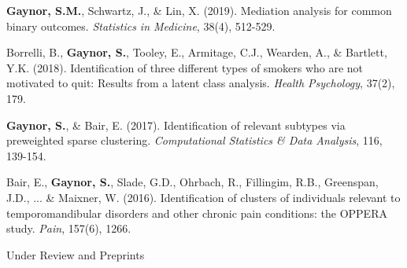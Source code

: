 \begin{cvpapers}
\cvpaper
    {\textbf{Gaynor, S.M.}, Schwartz, J., \& Lin, X. (2019). Mediation analysis for common binary outcomes. \textit{Statistics in Medicine}, 38(4), 512-529.} %
    {} %
    { } %
    {} %
    
    \cvpaper
    {Borrelli, B., \textbf{Gaynor, S.}, Tooley, E., Armitage, C.J., Wearden, A., \& Bartlett, Y.K. (2018). Identification of three different types of smokers who are not motivated to quit: Results from a latent class analysis. \textit{Health Psychology}, 37(2), 179.} %
    {} %
    { } %
    {} %
    
    
  \cvpaper
    {\textbf{Gaynor, S.}, \& Bair, E. (2017). Identification of relevant subtypes via preweighted sparse clustering. \textit{Computational Statistics \& Data Analysis}, 116, 139-154.} %
    {} %
    { } %
    {} %
    
 \cvpaper
    {Bair, E., \textbf{Gaynor, S.}, Slade, G.D., Ohrbach, R., Fillingim, R.B., Greenspan, J.D., ... \& Maixner, W. (2016). Identification of clusters of individuals relevant to temporomandibular disorders and other chronic pain conditions: the OPPERA study. \textit{Pain}, 157(6), 1266.} %
    {} %
    { } %
    {} %
    
    
\end{cvpapers}

Under Review and Preprints

